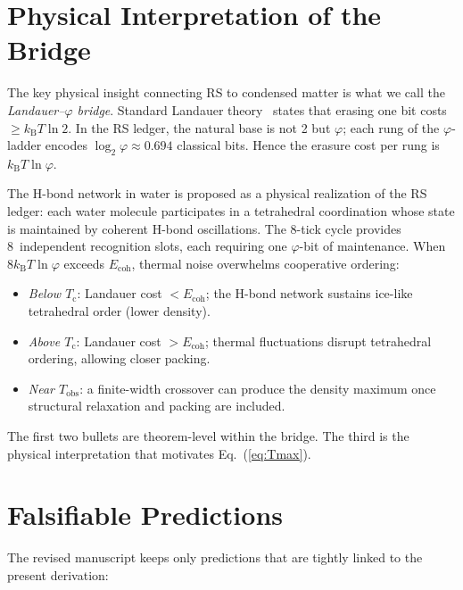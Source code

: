 \documentclass[aps,prl,twocolumn,superscriptaddress,showpacs,floatfix]{revtex4-2}
\newcommand{\Ecoh}{E_{\mathrm{coh}}}
\newcommand{\kB}{k_{\mathrm{B}}}
\newcommand{\Tc}{T_{\mathrm{c}}}
\newcommand{\Tobs}{T_{\mathrm{obs}}}
\newcommand{\phig}{\varphi}
\begin{document}
\section{Physical Interpretation of the Bridge}

The key physical insight connecting RS to condensed matter is what we call the \textit{Landauer--$\phig$ bridge}.
Standard Landauer theory~\cite{Landauer1961} states that erasing one bit costs $\geq \kB T \ln 2$.
In the RS ledger, the natural base is not 2 but $\phig$; each rung of the $\phig$-ladder encodes $\log_2\phig \approx 0.694$ classical bits.
Hence the erasure cost per rung is $\kB T \ln\phig$.

The H-bond network in water is proposed as a physical realization of the RS ledger: each water molecule participates in a tetrahedral coordination whose state is maintained by coherent H-bond oscillations.
The 8-tick cycle provides 8~independent recognition slots, each requiring one $\phig$-bit of maintenance.
When $8\kB T\ln\phig$ exceeds $\Ecoh$, thermal noise overwhelms cooperative ordering:
\begin{itemize}
\item \textit{Below $\Tc$}: Landauer cost $< \Ecoh$; the H-bond network sustains ice-like tetrahedral order (lower density).
\item \textit{Above $\Tc$}: Landauer cost $> \Ecoh$; thermal fluctuations disrupt tetrahedral ordering, allowing closer packing.
\item \textit{Near $\Tobs$}: a finite-width crossover can produce the density maximum once structural relaxation and packing are included.
\end{itemize}

The first two bullets are theorem-level within the bridge. The third is the physical interpretation that motivates Eq.~(\ref{eq:Tmax}).

\section{Falsifiable Predictions}

The revised manuscript keeps only predictions that are tightly linked to the present derivation:
\end{document}
